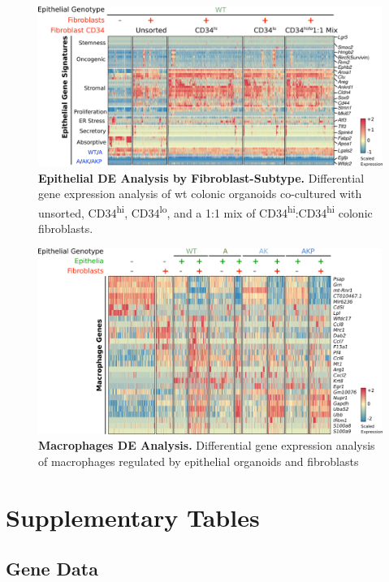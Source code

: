 \begin{figure}[h!]
    \centering
    \includegraphics{0Xappendices/0XSup_DEepibyfib.png}
    \caption{\textbf{Epithelial DE Analysis by Fibroblast-Subtype.} Differential gene expression analysis of \acrshort{wt} colonic organoids co-cultured with unsorted, CD34\textsuperscript{hi}, CD34\textsuperscript{lo}, and a 1:1 mix of CD34\textsuperscript{hi}:CD34\textsuperscript{hi} colonic fibroblasts.}
    \label{fig:deepibyfib}
\end{figure}

\begin{figure}[h!]
    \centering
    \includegraphics{0Xappendices/0XSup_DEmac.png}
    \caption{\textbf{Macrophages DE Analysis.} Differential gene expression analysis of macrophages regulated by epithelial organoids and fibroblasts}
    \label{fig:demac}
\end{figure}

\chapter{Supplementary Tables}
\label{appendix:SupTab}

\section{Gene Data}

